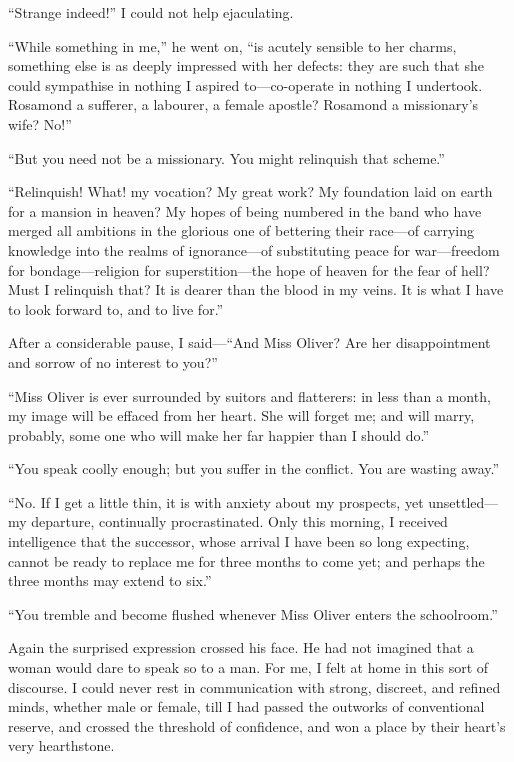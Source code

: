 \enquote{Strange indeed!} I could not help ejaculating.

\enquote{While something in me,} he went on, \enquote{is acutely
	sensible to her charms, something else is as deeply impressed with her
	defects: they are such that she could sympathise in nothing I aspired
	to---co-operate in nothing I undertook. Rosamond a sufferer, a
	labourer, a female apostle? Rosamond a missionary's wife? No!}

\enquote{But you need not be a missionary. You might relinquish that
	scheme.}

\enquote{Relinquish! What! my vocation? My great work? My foundation
	laid on earth for a mansion in heaven? My hopes of being numbered in
	the band who have merged all ambitions in the glorious one of bettering
	their race---of carrying knowledge into the realms of ignorance---of
	substituting peace for war---freedom for bondage---religion for
	superstition---the hope of heaven for the fear of hell? Must I
	relinquish that? It is dearer than the blood in my veins. It is what I
	have to look forward to, and to live for.}

After a considerable pause, I said---\enquote{And Miss Oliver? Are her
	disappointment and sorrow of no interest to you?}

\enquote{Miss Oliver is ever surrounded by suitors and flatterers: in
	less than a month, my image will be effaced from her heart. She will
	forget me; and will marry, probably, some one who will make her far
	happier than I should do.}

\enquote{You speak coolly enough; but you suffer in the conflict. You
	are wasting away.}

\enquote{No. If I get a little thin, it is with anxiety about my
	prospects, yet unsettled---my departure, continually procrastinated.
	Only this morning, I received intelligence that the successor, whose
	arrival I have been so long expecting, cannot be ready to replace me for
	three months to come yet; and perhaps the three months may extend to
	six.}

\enquote{You tremble and become flushed whenever Miss Oliver enters the
	schoolroom.}

Again the surprised expression crossed his face. He had not imagined
that a woman would dare to speak so to a man. For me, I felt at home in
this sort of discourse. I could never rest in communication with
strong, discreet, and refined minds, whether male or female, till I had
passed the outworks of conventional reserve, and crossed the threshold
of confidence, and won a place by their heart's very hearthstone.

